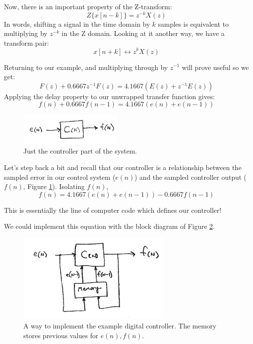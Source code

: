 
Now, there is an important property of the Z-transform:	%
\[
Z\{x[n-k]\} = z^{-k}X(z)
\]
 In  words, shifting a signal in the time domain by $k$ samples is equivalent to multiplying by $z^{-k}$ in the Z domain.   Looking at it another way, we have a transform pair:	%
\[
x[n+k] \leftrightarrow z^{k}X(z)
\]

Returning to our example, and	%
multiplying through by $z^{-1}$ will prove useful so we get:
\[
F(z)+0.6667z^{-1}F(z) = 4.1667 ( E(z) + z^{-1}E(z))
\]
Applying the delay property  to our unwrapped transfer function  gives:	%
\[
f(n)+0.6667f(n-1) = 4.1667 (e(n) + e(n-1))
\]

\begin{figure}\centering
\includegraphics[width=2.0in]{figs11/dt_ctlra.png}
\caption{Just the controller part of the system.}\label{F:dt_ctl}
\end{figure}

Let's step back a bit and recall that our controller is a relationship between the sampled error in our control system ($e(n)$) and the sampled controller output ($f(n)$, Figure \ref{F:dt_ctl}).  Isolating $f(n)$,	%
\[
f(n) = 4.1667 (e(n) + e(n-1))-0.6667f(n-1)
\]

This is essentially the line of computer code which defines our controller!  	%


 We could implement this equation with the block diagram of Figure \ref{F:DigitalControl}.	%

\begin{figure}\centering
\includegraphics[width=3.0in]{figs11/dig_ctl_bda.png}
\caption{A way to implement the example digital controller.  The memory stores previous values for $e(n), f(n)$. }\label{F:DigitalControl}
\end{figure}


